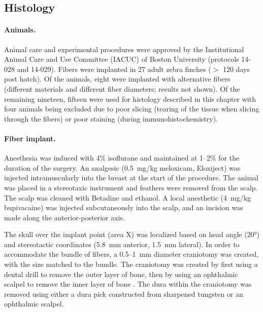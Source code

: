 \subsection{Histology}

\paragraph{Animals.} Animal care and experimental procedures were 
approved by the Institutional Animal Care and Use Committee (IACUC) 
of Boston University (protocols 14-028 and 14-029). Fibers were 
implanted in 27 adult zebra finches ($>$ 120 days post hatch). Of 
the animals, eight were implanted with alternative fibers 
(different materials and different fiber diameters; results not 
shown). Of the remaining nineteen, fifteen were used for histology 
described in this chapter with four animals being excluded due to 
poor slicing (tearing of the tissue when slicing through the 
fibers) or poor staining (during immunohistochemistry).

\paragraph{Fiber implant.} Anesthesia was induced with 4\% isoflurane 
and maintained at 1--2\% for the duration of the surgery. An analgesic 
(0.5~mg/kg meloxicam, Eloxiject) was injected intramuscularly into the 
breast at the start of the procedure. The animal was placed in a 
stereotaxic instrument and feathers were removed from the scalp. The 
scalp was cleaned with Betadine and ethanol. A local anesthetic 
(4~mg/kg bupivacaine) was injected subcutaneously into the scalp, and 
an incision was made along the anterior-posterior axis.

The skull over the implant point (area X) was localized based on head 
angle (\ang{20}) and stereotactic coordinates (5.8~mm anterior, 1.5~mm 
lateral). In order to accommodate the bundle of fibers, a 0.5--1~mm 
diameter craniotomy was created, with the size matched to the bundle. 
The craniotomy was created by first using a dental drill to remove the 
outer layer of bone, then by using an ophthalmic scalpel to remove the 
inner layer of bone \cite{Long:2010db}. The dura within the craniotomy 
was removed using either a dura pick constructed from sharpened 
tungsten or an ophthalmic scalpel.

